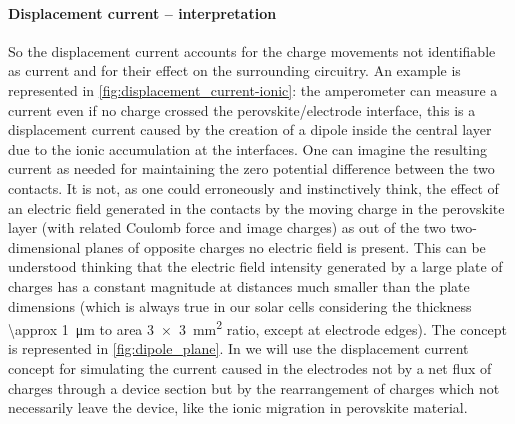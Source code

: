 		\paragraph{Displacement current -- interpretation}
		So the displacement current accounts for the charge movements not identifiable as current and for their effect on the surrounding circuitry.
		An example is represented in \cref{fig:displacement_current-ionic}: the amperometer can measure a current even if no charge crossed the perovskite/electrode interface, this is a displacement current caused by the creation of a dipole inside the central layer due to the ionic accumulation at the interfaces.
		One can imagine the resulting current as needed for maintaining the zero potential difference between the two contacts.
		It is not, as one could erroneously and instinctively think, the effect of an electric field generated in the contacts by the moving charge in the perovskite layer (with related Coulomb force and image charges) as out of the two two-dimensional planes of opposite charges no electric field is present.
		This can be understood thinking that the electric field intensity generated by a large plate of charges has a constant magnitude at distances much smaller than the plate dimensions (which is always true in our solar cells considering the thickness \SI{\approx 1}{\um} to area \SI{3x3}{\square\mm} ratio, except at electrode edges).
		The concept is represented in \cref{fig:dipole_plane}.
		In  we will use the displacement current concept for simulating the current caused in the electrodes not by a net flux of charges through a device section but by the rearrangement of charges which not necessarily leave the device, like the ionic migration in perovskite material.

		\begin{figure}
		\end{figure}

